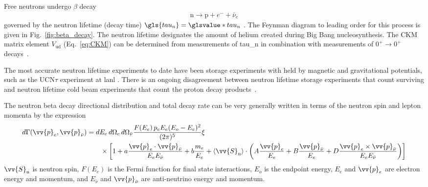 Free neutrons undergo $\beta$ decay
%
\begin{gather}
    \text{n}\rightarrow \text{p}+ e^-+\bar{\nu}_e
\end{gather}
%
governed by the neutron lifetime (decay time) $\gls{tau_n}=\glsvalue*{tau_n}$ \cite{pdg2022}. The Feynman diagram to leading order for this process is given in Fig.~\ref{fig:beta_decay}. The neutron lifetime designates the amount of helium created during Big Bang nucleosynthesis. The CKM matrix element $V_\text{ud}$ (Eq.~\ref{eq:CKM}) can be determined from measurements of \gls{tau_n} in combination with measurements of $0^+\rightarrow0^+$ decays~\cite{Young2014}.

The most accurate neutron lifetime experiments to date have been storage experiments with \ucn held by magnetic and gravitational potentials, such as the UCN$\tau$ experiment at \acrshort{lanl} \cite{gonzalez_ucn_tau}. There is an ongoing disagreement between neutron lifetime storage experiments that count surviving \ucn and neutron lifetime cold beam experiments that count the proton decay products~\cite{czarnecki2018}.

The neutron beta decay directional distribution and total decay rate can be very generally written in terms of the neutron spin and lepton momenta by the expression~\cite{Young2014}
%
\begin{align}
    d\Gamma(\vv{p}_e, \vv{p}_{\bar{\nu}}) &= dE_e\,d\Omega_e \,d\Omega_{\bar{\nu}} \frac{F(E_e)\,p_e E_e (E_o-E_e)^2}{(2\pi)^5} \xi \nonumber \\
    &\quad\quad \times \left[1 + a\frac{\vv{p}_e \cdot \vv{p}_{\bar{\nu}}}{E_e E_{\bar{\nu}}}
    +b\frac{m_e}{E_e} + \langle \vv{S}_\text{n} \rangle \cdot
    \left( A\frac{\vv{p}_e}{E_e} + B \frac{\vv{p}_{\bar{\nu}}}{E_e} + D\frac{\vv{p}_e\times \vv{p}_{\bar{\nu}}}{E_e E_{\bar{\nu}}}
    \right) \right]
\end{align}
%
$\vv{S}_\text{n}$ is neutron spin, $F(E_e)$ is the Fermi function for final state interactions, $E_o$ is the endpoint energy, $E_e$ and $\vv{p}_e$ are electron energy and momentum, and $E_{\bar{\nu}}$ and $\vv{p}_{\bar{\nu}}$ are anti-neutrino energy and momentum.

